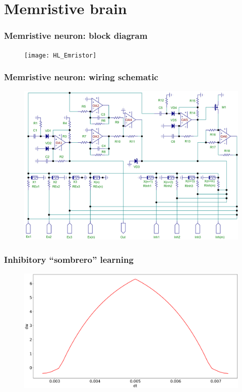 \documentclass[12pt, aspectratio=169]{beamer}
\begin{document}
\section{Memristive brain}

\begin{frame}
\frametitle{Memristive neuron: block diagram}
\begin{figure}
\texttt{[image: HL\_Emristor]}
\end{figure}
\end{frame}


\begin{frame}
\frametitle{Memristive neuron: wiring schematic}
\begin{figure}
\includegraphics[width=0.7\linewidth]{memristive_neuron_wiring}
\end{figure}
\end{frame}


\begin{frame}
\frametitle{Inhibitory ``sombrero'' learning}
\begin{figure}
\includegraphics[width=0.9\linewidth]{result_sombrero}
\end{figure}
\end{frame}
\end{document}
